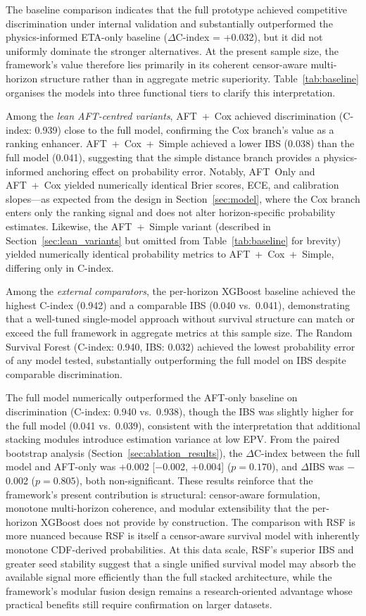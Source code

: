\documentclass[fire,article,submit,pdftex]{../Definitions/mdpi}
\begin{document}
The baseline comparison indicates that the full prototype achieved competitive discrimination under internal validation and substantially outperformed the physics-informed ETA-only baseline ($\Delta$C-index = +0.032), but it did not uniformly dominate the stronger alternatives.
At the present sample size, the framework's value therefore lies primarily in its coherent censor-aware multi-horizon structure rather than in aggregate metric superiority.
Table~\ref{tab:baseline} organises the models into three functional tiers to clarify this interpretation.

Among the \emph{lean AFT-centred variants}, AFT~+~Cox achieved discrimination (C-index: 0.939) close to the full model, confirming the Cox branch's value as a ranking enhancer.
AFT~+~Cox~+~Simple achieved a lower IBS (0.038) than the full model (0.041), suggesting that the simple distance branch provides a physics-informed anchoring effect on probability error.
Notably, AFT~Only and AFT~+~Cox yielded numerically identical Brier scores, ECE, and calibration slopes---as expected from the design in Section~\ref{sec:model}, where the Cox branch enters only the ranking signal and does not alter horizon-specific probability estimates.
Likewise, the AFT~+~Simple variant (described in Section~\ref{sec:lean_variants} but omitted from Table~\ref{tab:baseline} for brevity) yielded numerically identical probability metrics to AFT~+~Cox~+~Simple, differing only in C-index.

Among the \emph{external comparators}, the per-horizon XGBoost baseline achieved the highest C-index (0.942) and a comparable IBS (0.040 vs.\ 0.041), demonstrating that a well-tuned single-model approach without survival structure can match or exceed the full framework in aggregate metrics at this sample size.
The Random Survival Forest (C-index: 0.940, IBS: 0.032) achieved the lowest probability error of any model tested, substantially outperforming the full model on IBS despite comparable discrimination.

The full model numerically outperformed the AFT-only baseline on discrimination (C-index: 0.940 vs.\ 0.938), though the IBS was slightly higher for the full model (0.041 vs.\ 0.039), consistent with the interpretation that additional stacking modules introduce estimation variance at low EPV.
From the paired bootstrap analysis (Section~\ref{sec:ablation_results}), the $\Delta$C-index between the full model and AFT-only was +0.002 [$-$0.002, +0.004] ($p = 0.170$), and $\Delta$IBS was $-$0.002 ($p = 0.805$), both non-significant.
These results reinforce that the framework's present contribution is structural: censor-aware formulation, monotone multi-horizon coherence, and modular extensibility that the per-horizon XGBoost does not provide by construction.
The comparison with RSF is more nuanced because RSF is itself a censor-aware survival model with inherently monotone CDF-derived probabilities.
At this data scale, RSF's superior IBS and greater seed stability suggest that a single unified survival model may absorb the available signal more efficiently than the full stacked architecture, while the framework's modular fusion design remains a research-oriented advantage whose practical benefits still require confirmation on larger datasets.
\end{document}
